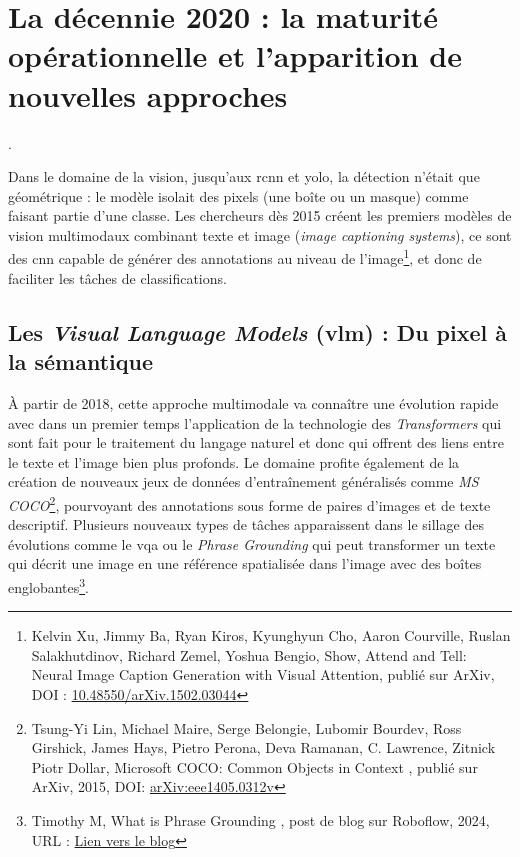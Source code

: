 \section[2020 : les nouvelles approches]{La décennie 2020 : la maturité opérationnelle et l'apparition de nouvelles approches}. 

Dans le domaine de la vision, jusqu'aux \gls{rcnn} et \gls{yolo}, la détection n'était que géométrique : le modèle isolait des pixels (une boîte ou un masque) comme faisant partie d'une classe. Les chercheurs dès 2015 créent les premiers modèles de vision multimodaux combinant texte et image (\textit{image captioning systems}), ce sont des \gls{cnn} capable de générer des annotations au niveau de l'image\footnote{Kelvin Xu, Jimmy Ba, Ryan Kiros, Kyunghyun Cho, Aaron Courville, Ruslan Salakhutdinov, Richard Zemel, Yoshua Bengio, \og Show, Attend and Tell: Neural Image Caption Generation with Visual Attention\fg, publié sur ArXiv, DOI : \href{10.48550/arXiv.1502.03044}{10.48550/arXiv.1502.03044}}, et donc de faciliter les tâches de classifications. 

\subsection{Les \textit{Visual Language Models} (\gls{vlm}) : Du pixel à la sémantique}

À partir de 2018, cette approche multimodale va connaître une évolution rapide avec dans un premier temps l'application de la technologie des \textit{Transformers} qui sont fait pour le traitement du langage naturel et donc qui offrent des liens entre le texte et l'image bien plus profonds. Le domaine profite également de la création de nouveaux jeux de données d'entraînement généralisés comme \textit{MS COCO}\footnote{Tsung-Yi Lin,  Michael Maire, Serge Belongie, Lubomir Bourdev, Ross Girshick, James Hays, Pietro Perona, Deva Ramanan, C. Lawrence, Zitnick Piotr Dollar, \og Microsoft COCO: Common Objects in Context \fg, publié sur ArXiv, 2015, DOI: \href{arXiv:1405.0312v}{arXiv:eee1405.0312v}}, pourvoyant des annotations sous forme de paires d'images et de texte descriptif. Plusieurs nouveaux types de tâches apparaissent dans le sillage des évolutions comme le \gls{vqa} ou le \textit{Phrase Grounding} qui peut transformer un texte qui décrit une image en une référence spatialisée dans l'image avec des boîtes englobantes\footnote{Timothy M, \og What is Phrase Grounding \fg, post de blog sur Roboflow, 2024, URL : \href{https://blog.roboflow.com/what-is-phrase-grounding/}{Lien vers le blog}}.

